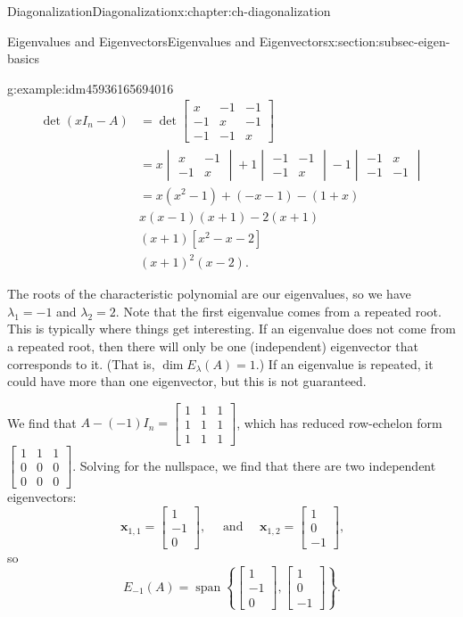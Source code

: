 \documentclass[oneside,10pt,]{book}
\numberwithin{equation}{section}
\newcommand{\spn}{\operatorname{span}}
\newcommand{\bbm}{\begin{bmatrix}}
\newcommand{\ebm}{\end{bmatrix}}
\newcommand{\xx}{\mathbf{x}}
\newcommand{\amp}{&}
\begin{document}
\begin{chapterptx}{Diagonalization}{}{Diagonalization}{}{}{x:chapter:ch-diagonalization}
\begin{sectionptx}{Eigenvalues and Eigenvectors}{}{Eigenvalues and Eigenvectors}{}{}{x:section:subsec-eigen-basics}
\begin{example}{}{g:example:idm45936165694016}
\begin{align*}
\det(xI_n - A) \amp =\det\bbm x \amp -1\amp -1\\-1\amp x \amp -1\\-1\amp -1\amp x\ebm\\
\amp = x \begin{vmatrix}x \amp -1\\-1\amp x\end{vmatrix}
+1\begin{vmatrix}-1\amp -1\\-1\amp x\end{vmatrix}
-1\begin{vmatrix}-1\amp x\\-1\amp -1\end{vmatrix}\\
\amp = x(x^2-1)+(-x-1)-(1+x)\\
\amp x(x-1)(x+1)-2(x+1)\\
\amp (x+1)[x^2-x-2]\\
\amp (x+1)^2(x-2)\text{.}
\end{align*}
%
\par
The roots of the characteristic polynomial are our eigenvalues, so we have \(\lambda_1=-1\) and \(\lambda_2=2\). Note that the first eigenvalue comes from a repeated root. This is typically where things get interesting. If an eigenvalue does not come from a repeated root, then there will only be one (independent) eigenvector that corresponds to it. (That is, \(\dim E_\lambda(A)=1\).) If an eigenvalue is repeated, it could have more than one eigenvector, but this is not guaranteed.%
\par
We find that \(A-(-1)I_n = \bbm 1\amp 1\amp 1\\1\amp 1\amp 1\\1\amp 1\amp 1\ebm\), which has reduced row-echelon form \(\bbm 1\amp 1\amp 1\\0\amp 0\amp 0\\0\amp 0\amp 0\ebm\). Solving for the nullspace, we find that there are two independent eigenvectors:%
\begin{equation*}
\xx_{1,1}=\bbm 1\\-1\\0\ebm, \quad \text{ and } \quad \xx_{1,2}=\bbm 1\\0\\-1\ebm\text{,}
\end{equation*}
so%
\begin{equation*}
E_{-1}(A) = \spn\left\{\bbm 1\\-1\\0\ebm, \bbm 1\\0\\-1\ebm\right\}\text{.}

\end{equation*}
\end{example}
\end{sectionptx}
\end{chapterptx}
\end{document}
